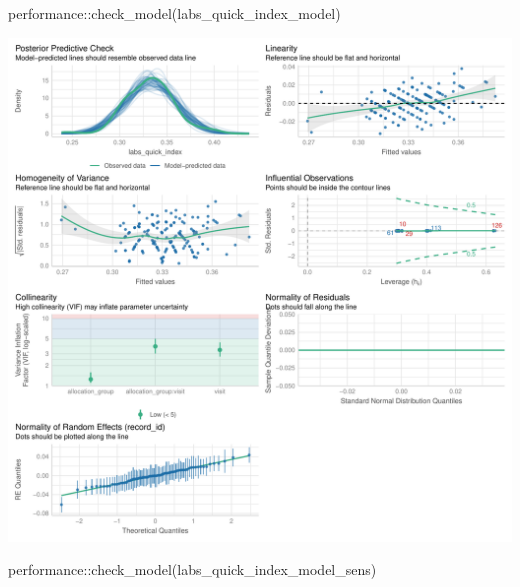 \documentclass[
  12pt,
]{article}
\newenvironment{Shaded}{\begin{snugshade}}{\end{snugshade}}
\newcommand{\FunctionTok}[1]{\textcolor[rgb]{0.28,0.35,0.67}{#1}}
\newcommand{\NormalTok}[1]{\textcolor[rgb]{0.00,0.23,0.31}{#1}}
\newcommand{\SpecialCharTok}[1]{\textcolor[rgb]{0.37,0.37,0.37}{#1}}
\begin{document}
\begin{Shaded}
\begin{Highlighting}[]
\NormalTok{performance}\SpecialCharTok{::}\FunctionTok{check\_model}\NormalTok{(labs\_quick\_index\_model)}
\end{Highlighting}
\end{Shaded}

\includegraphics{Outcomes_files/figure-pdf/labs_quick_index_4-1.pdf}

\begin{Shaded}
\begin{Highlighting}[]
\NormalTok{performance}\SpecialCharTok{::}\FunctionTok{check\_model}\NormalTok{(labs\_quick\_index\_model\_sens)}
\end{Highlighting}
\end{Shaded}
\end{document}
